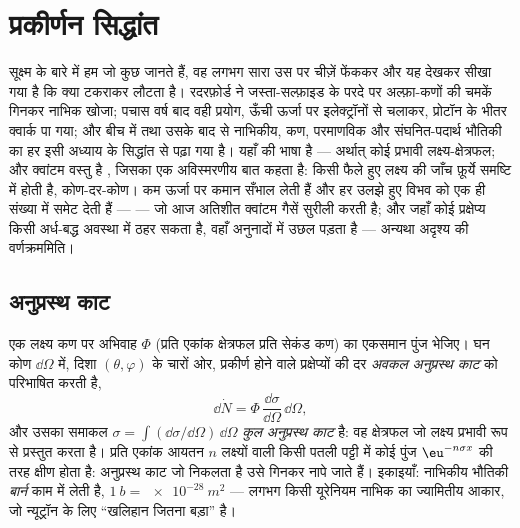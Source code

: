 \chapter{प्रकीर्णन सिद्धांत}\label{ch:b3:scattering-theory}

सूक्ष्म के बारे में हम जो कुछ जानते हैं, वह लगभग सारा उस पर चीज़ें
फेंककर और यह देखकर सीखा गया है कि क्या टकराकर लौटता है। रदरफ़ोर्ड ने
जस्ता-सल्फ़ाइड के परदे पर अल्फ़ा-कणों की चमकें गिनकर नाभिक खोजा; पचास
वर्ष बाद वही प्रयोग, ऊँची ऊर्जा पर इलेक्ट्रॉनों से चलाकर, प्रोटॉन के
भीतर क्वार्क पा गया; और बीच में तथा उसके बाद से नाभिकीय, कण, परमाणविक
और संघनित-पदार्थ भौतिकी का हर  इसी अध्याय के सिद्धांत से
पढ़ा गया है। यहाँ की भाषा है \emph{} --- अर्थात् कोई
प्रभावी लक्ष्य-क्षेत्रफल; और क्वांटम वस्तु है \emph{},
जिसका  एक अविस्मरणीय बात कहता है: किसी फैले हुए लक्ष्य
की जाँच फ़ूर्ये समष्टि में होती है, कोण-दर-कोण। कम ऊर्जा पर  कमान सँभाल लेती हैं और हर उलझे हुए विभव को एक ही संख्या में
समेट देती हैं ---  --- जो आज अतिशीत क्वांटम गैसें
सुरीली करती है; और जहाँ कोई प्रक्षेप्य किसी अर्ध-बद्ध अवस्था में ठहर
सकता है, वहाँ  अनुनादों में उछल पड़ता है --- अन्यथा
अदृश्य की वर्णक्रममिति।

\section{अनुप्रस्थ काट}

\begin{definition}[अनुप्रस्थ काट]\label{def:b3:scattering-theory:cross-section}
एक लक्ष्य कण पर अभिवाह $\Phi$ (प्रति एकांक क्षेत्रफल प्रति सेकंड कण)
का एकसमान पुंज भेजिए। घन कोण $\dd\Omega$ में, दिशा $(\theta,
\varphi)$ के चारों ओर, प्रकीर्ण होने वाले प्रक्षेप्यों की दर
\emph{अवकल अनुप्रस्थ काट} को परिभाषित करती है,
\[
\dd\dot N = \Phi\,\frac{\dd\sigma}{\dd\Omega}\,\dd\Omega ,
\]
और उसका समाकल $\sigma = \int(\dd\sigma/\dd\Omega)\,\dd\Omega$
\emph{कुल अनुप्रस्थ काट} है: वह क्षेत्रफल जो लक्ष्य प्रभावी रूप से
प्रस्तुत करता है। प्रति एकांक आयतन $n$ लक्ष्यों वाली किसी पतली पट्टी
में कोई पुंज $\eu^{-n\sigma x}$ की तरह क्षीण होता है: अनुप्रस्थ काट
जो निकलता है उसे गिनकर नापे जाते हैं। इकाइयाँ: नाभिकीय भौतिकी
\emph{बार्न} काम में लेती है,
$\qty{1}{b} = \qty{e-28}{m^2}$ --- लगभग किसी यूरेनियम नाभिक का
ज्यामितीय आकार, जो न्यूट्रॉन के लिए ``खलिहान जितना बड़ा'' है।
\end{definition}

